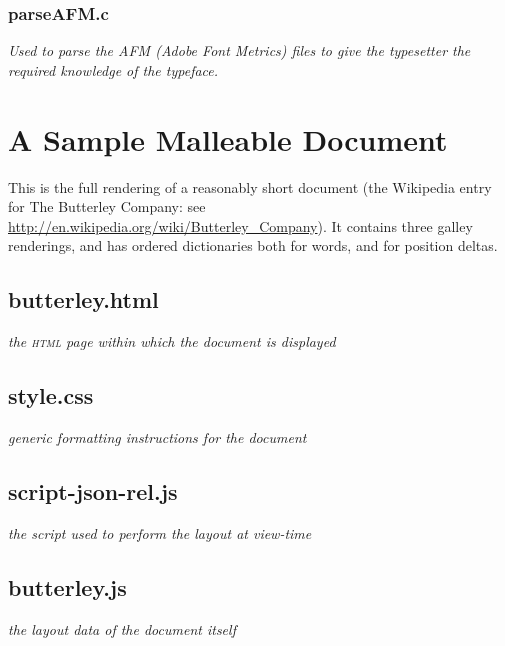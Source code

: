 \newpage

\subsection{parseAFM.c}
\emph{Used to parse the AFM (Adobe Font Metrics) files to give the typesetter the required knowledge of the typeface.}


\newpage

\cleardoublepage
\chapter{A Sample Malleable Document}
\label{app:sampledoc}

This is the full rendering of a reasonably short document (the Wikipedia entry for The Butterley Company: see \url{http://en.wikipedia.org/wiki/Butterley_Company}). It contains three galley renderings, and has ordered dictionaries both for words, and for position deltas.

\section{butterley.html}
\emph{the \textsc{html} page within which the document is displayed}


\section{style.css}
\emph{generic formatting instructions for the document}

\newpage

\section{script-json-rel.js}
\emph{the script used to perform the layout at view-time}


\newpage

\section{butterley.js}
\emph{the layout data of the document itself}

